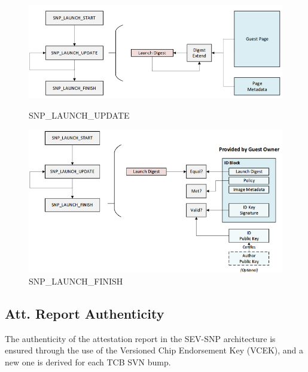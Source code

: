\begin{figure}[h]
    \centering
    \begin{minipage}{0.45\textwidth}
        \centering
        \includegraphics[width=\textwidth]{img/snp-update.png}
        \caption{SNP\_LAUNCH\_UPDATE}
        \label{fig:snp_update}
    \end{minipage}
    \hfill
    \begin{minipage}{0.45\textwidth}
        \centering
        \includegraphics[width=\textwidth]{img/snp-finish.png}
        \caption{SNP\_LAUNCH\_FINISH}
        \label{fig:snp_finish}
    \end{minipage}
\end{figure}


\subsection{Att. Report Authenticity}

The authenticity of the attestation report in the SEV-SNP architecture is ensured through the use of the Versioned Chip Endorsement Key (VCEK), and a new one is derived for each TCB SVN bump. \\


